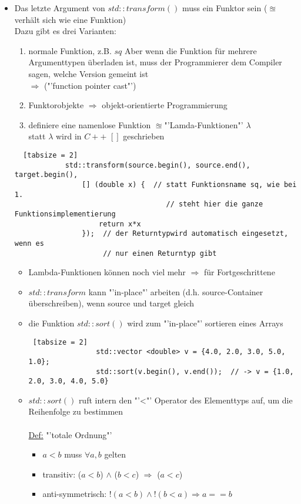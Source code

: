 \documentclass{article}
\begin{document}
	\begin{itemize}
	\item Das letzte Argument von $std::transform()$ muss ein Funktor sein ($\approxeq$ verhält sich wie eine Funktion) \\
	Dazu gibt es drei Varianten:
		\begin{enumerate}
			\item normale Funktion, z.B. $sq$ Aber wenn die Funktion für mehrere Argumenttypen überladen ist, muss der Programmierer dem Compiler sagen, welche Version gemeint ist \\ $\Rightarrow$ ("'function pointer cast"')
			\item  Funktorobjekte $\Rightarrow$ objekt-orientierte Programmierung
			\item definiere eine namenlose Funktion $\approxeq$"'Lamda-Funktionen"' $\lambda$ \\
			statt $\lambda$ wird in $C++$ $[]$ geschrieben
		\end{enumerate}
		\begin{lstlisting} 	[tabsize = 2]
			std::transform(source.begin(), source.end(), target.begin(), 
				[] (double x) {  // statt Funktionsname sq, wie bei 1. 
									// steht hier die ganze Funktionsimplementierung
					return x*x
				});  // der Returntypwird automatisch eingesetzt, wenn es 
					 // nur einen Returntyp gibt
		\end{lstlisting}
		\begin{itemize}
			\item Lambda-Funktionen können noch viel mehr $\Rightarrow$ für Fortgeschrittene
			\item $std::transform$ kann "'in-place"' arbeiten (d.h. source-Container überschreiben), wenn source und target gleich
			\item die Funktion $std::sort()$ wird zum "'in-place"' sortieren eines Arrays
			\begin{lstlisting} [tabsize = 2]
				std::vector <double> v = {4.0, 2.0, 3.0, 5.0, 1.0};
				std::sort(v.begin(), v.end());  // -> v = {1.0, 2.0, 3.0, 4.0, 5.0}
			\end{lstlisting}
			
			\item $std::sort()$ ruft intern den "'<"' Operator des Elementtyps auf, um die Reihenfolge zu bestimmen \\ \\
			\underline{Def:} "'totale Ordnung"'
			\begin{itemize}
				\item $a<b$ muss $\forall a,b$ gelten
				\item transitiv: ($a<b$) $\wedge$ ($b<c$) $\Rightarrow$ ($a<c$)
				\item anti-symmetrisch: $!(a<b) \wedge !(b<a) \Rightarrow a ==b$
			\end{itemize}
		\end{itemize}
	\end{itemize}
	
\end{document}
